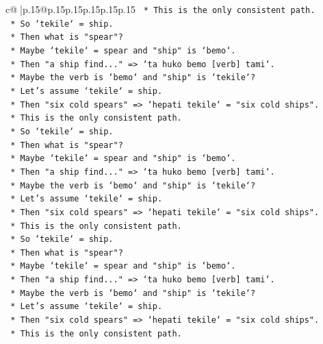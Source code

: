 \documentclass{article}
\begin{document}
{\begin{supertabular}{c@{$\;$}|p{.15\linewidth}@{}p{.15\linewidth}p{.15\linewidth}p{.15\linewidth}p{.15\linewidth}p{.15\linewidth}}
{{{\texttt{            *   This is the only consistent path.} \\
\texttt{            *   So `tekile` = ship.} \\
\texttt{            *   Then what is "spear"?} \\
\texttt{            *   Maybe `tekile` = spear and "ship" is `bemo`.} \\
\texttt{            *   Then "a ship find..." => `ta huko bemo {[}verb{]} tami`.} \\
\texttt{            *   Maybe the verb is `bemo` and "ship" is `tekile`?} \\
\texttt{            *   Let's assume `tekile` = ship.} \\
\texttt{            *   Then "six cold spears" => `hepati tekile` = "six cold ships".} \\
\texttt{            *   This is the only consistent path.} \\
\texttt{            *   So `tekile` = ship.} \\
\texttt{            *   Then what is "spear"?} \\
\texttt{            *   Maybe `tekile` = spear and "ship" is `bemo`.} \\
\texttt{            *   Then "a ship find..." => `ta huko bemo {[}verb{]} tami`.} \\
\texttt{            *   Maybe the verb is `bemo` and "ship" is `tekile`?} \\
\texttt{            *   Let's assume `tekile` = ship.} \\
\texttt{            *   Then "six cold spears" => `hepati tekile` = "six cold ships".} \\
\texttt{            *   This is the only consistent path.} \\
\texttt{            *   So `tekile` = ship.} \\
\texttt{            *   Then what is "spear"?} \\
\texttt{            *   Maybe `tekile` = spear and "ship" is `bemo`.} \\
\texttt{            *   Then "a ship find..." => `ta huko bemo {[}verb{]} tami`.} \\
\texttt{            *   Maybe the verb is `bemo` and "ship" is `tekile`?} \\
\texttt{            *   Let's assume `tekile` = ship.} \\
\texttt{            *   Then "six cold spears" => `hepati tekile` = "six cold ships".} \\
\texttt{            *   This is the only consistent path.} \\
}}}
\end{supertabular}}
\end{document}

